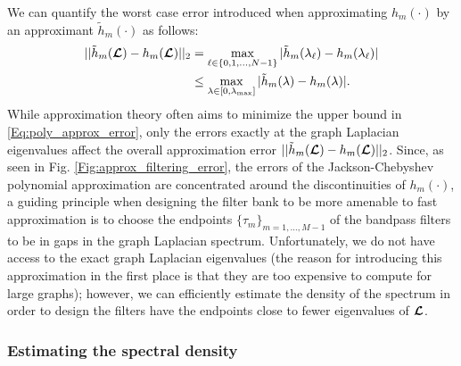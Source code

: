 \documentclass[journal, 10pt]{IEEEtran}
\begin{document}
We can quantify the worst case error introduced when approximating  $h_m(\cdot)$ by an approximant $\tilde{h}_m(\cdot)$ as follows:
\begin{align} \label{Eq:poly_approx_error}
||\tilde{h}_m(\L)-h_m(\L) ||_2   &= \max_{\l \in \{0,1,\ldots,N-1\}}|\tilde{h}_m(\lambda_{\l})-h_m(\lambda_{\l}) |  \nonumber \\
 &\leq \max_{\lambda \in [0,\lambda_{\max}]}|\tilde{h}_m(\lambda)-h_m(\lambda) |.
\end{align}
While approximation theory often aims to minimize the upper bound in \eqref{Eq:poly_approx_error}, only the errors exactly at the graph Laplacian eigenvalues affect the overall approximation error $||\tilde{h}_m(\boldsymbol{\mathcal{L}})-h_m(\boldsymbol{\mathcal{L}}) ||_2$. Since, as seen in Fig. \ref{Fig:approx_filtering_error}, the errors of the Jackson-Chebyshev polynomial approximation are concentrated around the discontinuities of $h_m(\cdot)$, a guiding principle when designing the filter bank to be more amenable to fast approximation is to choose the endpoints $\{\tau_m\}_{m=1,\ldots,M-1}$ of the bandpass filters to be in gaps in the graph Laplacian spectrum. Unfortunately, we do not have access to the exact graph Laplacian eigenvalues (the reason for introducing this approximation in the first place is that they are too expensive to compute for large graphs); however, we can efficiently estimate the density of the spectrum in order to design the filters %
have the endpoints close to fewer eigenvalues of $\boldsymbol{\mathcal{L}}$.

\subsubsection{Estimating the spectral density} \label{Se:spectral_density}
\end{document}
